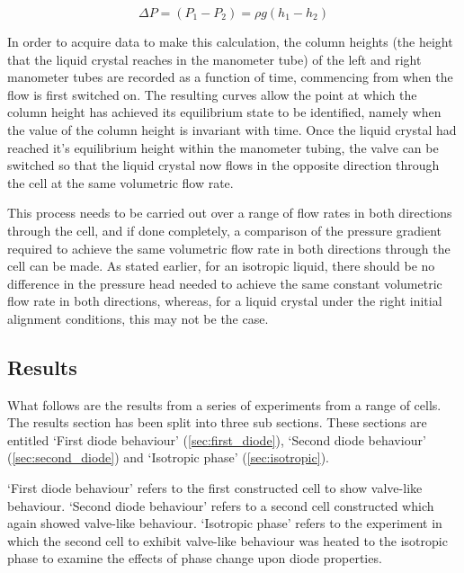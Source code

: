 \begin{equation}
\Delta P=\left(P_1-P_2\right)=\rho g \left(h_1-h_2\right)
\label{eq:pressures}
\end{equation}

In order to acquire data to make this calculation, the column heights (the height that the liquid crystal reaches in the manometer tube) of the left and right manometer tubes are recorded as a function of time, commencing from when the flow is first switched on. The resulting curves allow the point at which the column height has achieved its equilibrium state to be identified, namely when the value of the column height is invariant with time. Once the liquid crystal had reached it's equilibrium height within the manometer tubing, the valve can be switched so that the liquid crystal now flows in the opposite direction through the cell at the same volumetric flow rate.

This process needs to be carried out over a range of flow rates in both directions through the cell, and if done completely, a comparison of the pressure gradient required to achieve the same volumetric flow rate in both directions through the cell can be made. As stated earlier, for an isotropic liquid, there should be no difference in the pressure head needed to achieve the same constant volumetric flow rate in both directions, whereas, for a liquid crystal under the right initial alignment conditions, this may not be the case.



\subsection{Results}
What follows are the results from a series of experiments from a range of cells. The results section has been split into three sub sections. These sections are entitled `First diode behaviour' (\ref{sec:first_diode}), `Second diode behaviour' (\ref{sec:second_diode}) and `Isotropic phase' (\ref{sec:isotropic}).

`First diode behaviour' refers to the first constructed cell to show valve-like behaviour. `Second diode behaviour' refers to a second cell constructed which again showed valve-like behaviour. `Isotropic phase' refers to the experiment in which the second cell to exhibit valve-like behaviour was heated to the isotropic phase to examine the effects of phase change upon diode properties.


